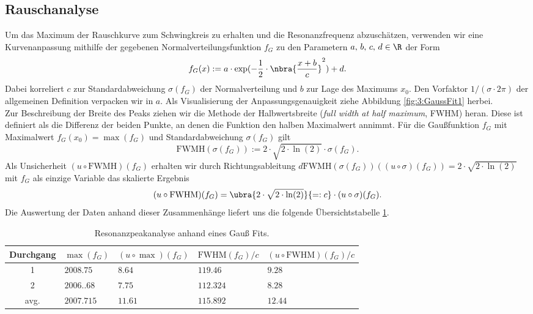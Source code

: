 \documentclass{article}
\begin{document}
    \subsection{Rauschanalyse}\label{subsec:3:Rauschanalyse}
    Um das Maximum der Rauschkurve zum Schwingkreis zu erhalten und die Resonanzfrequenz abzuschätzen, verwenden wir eine Kurvenanpassung mithilfe der gegebenen Normalverteilungsfunktion $f_G$ zu den Parametern $a,\, b,\, c,\, d\in\R$ der Form
    \[
        f_G(x) := a\cdot\exp(-\frac{1}{2}\cdot\nbra{\frac{x + b}{c}}^2) + d.
    \]
    Dabei korreliert $c$ zur Standardabweichung $\sigma(f_G)$ der Normalverteilung und $b$ zur Lage des Maximums $x_0$. Den Vorfaktor $1/(\sigma\cdot 2\pi)$ der allgemeinen Definition verpacken wir in $a$. Als Visualisierung der Anpassungsgenauigkeit ziehe Abbildung \ref{fig:3:GaussFit1} herbei. \\
    Zur Beschreibung der Breite des Peaks ziehen wir die Methode der Halbwertsbreite (\emph{full width at half maximum}, FWHM) heran. Diese ist definiert als die Differenz der beiden Punkte, an denen die Funktion den halben Maximalwert annimmt. Für die Gaußfunktion $f_G$ mit Maximalwert $f_G(x_0) = \max(f_G)$ und Standardabweichung $\sigma(f_G)$ gilt
    \[
        \text{FWMH}(\sigma(f_G)) := 2\cdot\sqrt{2\cdot\ln(2)}\cdot\sigma(f_G).
    \]
    Als Unsicherheit $(u\circ\text{FWMH})(f_G)$ erhalten wir durch Richtungsableitung $d\text{FWMH}(\sigma(f_G))((u\circ\sigma)(f_G)) = 2\cdot\sqrt{2\cdot\ln(2)}$ mit $f_G$ als einzige Variable das skalierte Ergebnis \cite[wiki]{enwiki:FWHM}
    \[
        (u\circ\text{FWHM})(f_G) = \ubra{2\cdot\sqrt{2\cdot\ln(2)}}{=:c}\cdot (u\circ\sigma)(f_G).
    \] 
    Die Auswertung der Daten anhand dieser Zusammenhänge liefert uns die folgende Übersichtstabelle \ref{tab:3:PeakInfo}.
    \begin{table}[H]
       \centering
       \begin{tabular}{c|ll|ll}
            \textbf{Durchgang} & $\max(f_G)$ & $(u\circ\max)(f_G)$ & $\text{FWHM}(f_G)/c$ & $(u\circ\text{FWHM})(f_G)/c$ \\
            \hline
            1 & $2008.75$ & $8.64$ & $119.46$ & $9.28$ \\
            2 & $2006..68$ & $7.75$ & $112.324$ & $8.28$ \\
            \hline
            avg. & $2007.715$ & $11.61$ & $115.892$ & $12.44$
        \end{tabular} 
        \caption{Resonanzpeakanalyse anhand eines Gauß Fits.}
        \label{tab:3:PeakInfo}
    \end{table}
\end{document}
